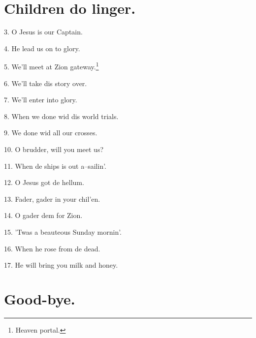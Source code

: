 \documentclass[a5paper,10pt]{book}
\begin{document}
\begin{extra}
\end{extra}

\newpage
\section{Children do linger.}
\thispagestyle{empty}

\begin{song}
\end{song}

\begin{stanza}
\item[3.]
  O Jesus is our Captain.
\item[4.]
  He lead us on to glory.
\item[5.]
  We'll meet at Zion gateway.\footnote[1]{Heaven portal.}
\item[6.]
  We'll take dis story over.
\item[7.]
  We'll enter into glory.
\item[8.]
  When we done wid dis world trials.
\item[9.]
  We done wid all our crosses.
\item[10.]
  O brudder, will you meet us?
\item[11.]
  When de ships is out a--sailin'.
\item[12.]
  O Jesus got de hellum.
\item[13.]
  Fader, gader in your chil'en.
\item[14.]
  O gader dem for Zion.
\item[15.]
  'Twas a beauteous Sunday mornin'.
\item[16.]
  When he rose from de dead.
\item[17.]
  He will bring you milk and honey.
\end{stanza}


\newpage
\section{Good-bye.}
\thispagestyle{empty}

\begin{song}
\end{song}

\bigskip
\begin{extra}
\end{extra}
\end{document}
